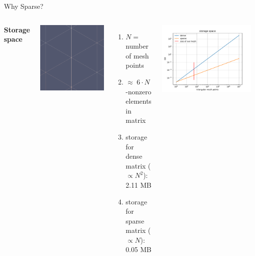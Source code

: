 \documentclass[aspectratio=169,xcolor=dvipsnames]{beamer}
\begin{document}
\begin{frame}{Why Sparse?}
    \begin{columns}[c] %

        
        \textbf{Storage space}
        \begin{center}
    \includegraphics[width=0.3\linewidth]{mesh.png}
    \end{center}
        \begin{enumerate}
        	\item $N=$ number of mesh points
            \item $\approx \; 6 \cdot N $ -nonzero elements in matrix
            \item storage for dense matrix ($\propto N^2$): \\ 2.11 MB
            \item storage for sparse matrix ($\propto N$): \\ 0.05 MB
        \end{enumerate}

        \begin{center}
    \includegraphics[width=1\linewidth]{storage_space.pdf}
    \end{center}

    \end{columns}
\end{frame}
\end{document}
